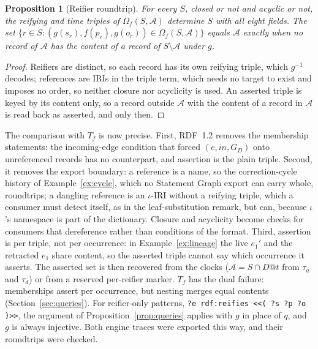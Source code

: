 \documentclass[11pt]{article}
\theoremstyle{plain}
\newtheorem{proposition}[theorem]{Proposition}
\theoremstyle{definition}
\theoremstyle{remark}
\begin{document}
\begin{proposition}[Reifier roundtrip]\label{prop:rdf12}
For every $S$, closed or not and acyclic or not, the reifying and time triples of
$\Omega_f(S,\mathcal A)$ determine $S$ with all eight fields. The set
$\{r\in S:(g(s_r),f(p_r),g(o_r))\in\Omega_f(S,\mathcal A)\}$ equals $\mathcal A$
exactly when no record of $\mathcal A$ has the content of a record of
$S\setminus\mathcal A$ under $g$.
\end{proposition}
\begin{proof}
Reifiers are distinct, so each record has its own reifying triple, which $g^{-1}$
decodes; references are IRIs in the triple term, which needs no target to exist and
imposes no order, so neither closure nor acyclicity is used. An asserted triple is
keyed by its content only, so a record outside $\mathcal A$ with the content of a
record in $\mathcal A$ is read back as asserted, and only then.
\end{proof}

The comparison with $T_f$ is now precise. First, RDF~1.2 removes the membership
statements: the incoming-edge condition that forced $(e,\mathit{in},G_D)$ onto
unreferenced records has no counterpart, and assertion is the plain triple. Second,
it removes the export boundary: a reference is a name, so the correction-cycle
history of Example~\ref{ex:cycle}, which no Statement Graph export can carry whole,
roundtrips; a dangling reference is an $\iota$-IRI without a reifying triple, which
a consumer must detect itself, as in the leaf-substitution remark, but can, because
$\iota$'s namespace is part of the dictionary. Closure and acyclicity become checks
for consumers that dereference rather than conditions of the format. Third,
assertion is per triple, not per occurrence: in Example~\ref{ex:lineage} the live
$e_1'$ and the retracted $e_1$ share content, so the asserted triple cannot say
which occurrence it asserts. The asserted set is then recovered from the clocks
($\mathcal A=S\cap D@t$ from $\tau_a$ and $\tau_d$) or from a reserved per-reifier
marker. $T_f$ has the dual failure: memberships assert per occurrence, but nesting
merges equal contents (Section~\ref{sec:queries}). For reifier-only patterns,
\texttt{?e rdf:reifies \textless{}\textless{}( ?s ?p ?o )\textgreater{}\textgreater{}}, the argument of
Proposition~\ref{prop:queries} applies with $g$ in place of $q$, and $g$ is always
injective. Both engine traces were exported this way, and their roundtrips were checked.
\end{document}
